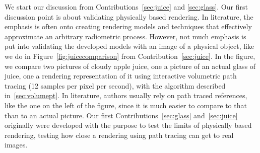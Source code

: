 We start our discussion from Contributions~\ref{sec:juice} and \ref{sec:glass}. Our first discussion point is about validating physically based rendering. In literature, the emphasis is often onto creating rendering models and techniques that effectively approximate an arbitrary radiometric process. However, not much emphasis is put into validating the developed models with an image of a physical object, like we do in Figure~\ref{fig:juicecomparison} from Contribution~\ref{sec:juice}. In the figure, we compare two pictures of cloudy apple juice, one a picture of an actual glass of juice, one a rendering representation of it using interactive volumetric path tracing (12 samples per pixel per second), with the algorithm described in~\ref{sec:volumept}. In literature, authors usually rely on path traced references, like the one on the left of the figure, since it is much easier to compare to that than to an actual picture. Our first Contributions~\ref{sec:glass} and~\ref{sec:juice} originally were developed with the purpose to test the limits of physically based rendering, testing how close a rendering using path tracing can get to real images.  

